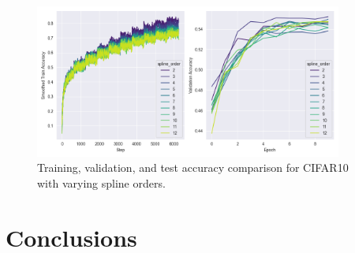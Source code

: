 \documentclass{article}
\begin{document}
\begin{figure}[H]
    \centering
    \includegraphics[width=0.9\textwidth]{pics/cifar10_accuracy_spline_order}
    \caption{Training, validation, and test accuracy comparison for CIFAR10 with varying spline orders.}
    \label{fig:cifar10_accuracy_spline_order}
\end{figure}


\section{Conclusions}\label{sec:conclusions}


\clearpage %





\end{document}
